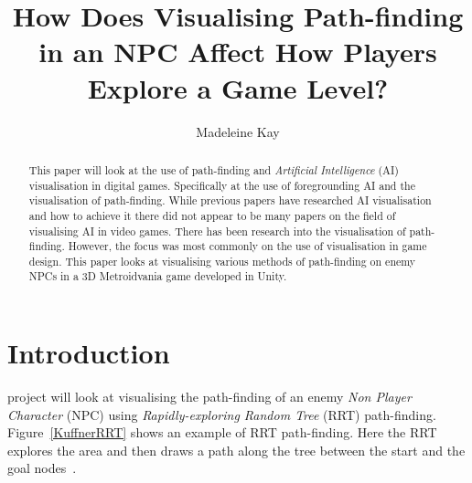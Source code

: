 \documentclass[journal]{IEEEtran}
\begin{document}
	\title{ How Does Visualising Path-finding in an NPC Affect How Players Explore a Game Level?}
	\author{Madeleine Kay}
	
	
	\maketitle
	
	\begin{abstract}
		This paper will look at the use of path-finding and \textit{Artificial Intelligence} (AI) visualisation in digital games.   Specifically at the use of foregrounding AI and the visualisation of path-finding. 
		While previous papers have researched AI visualisation and how to achieve it there did not appear to be many papers on the field of visualising AI in video games. There has been research into the visualisation of path-finding. However, the focus was most commonly on the use of visualisation in game design. 
		This paper looks at visualising various methods of path-finding on enemy NPCs in a 3D Metroidvania game developed in Unity.\\
		
	\end{abstract}
	
	\section{Introduction} \label{introduction}
	 project will look at visualising the path-finding of an enemy \textit{Non Player Character} (NPC) using \textit{Rapidly-exploring Random Tree} (RRT) path-finding.  Figure~\ref{KuffnerRRT} shows an example of RRT path-finding. Here the RRT explores the area and then draws a path along the tree between the start and the goal nodes~\cite{Kuffner2000}. 
	
\end{document}
